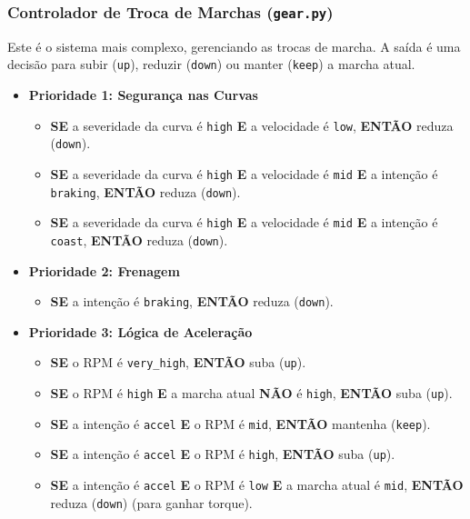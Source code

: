 \documentclass[12pt]{article}
\begin{document}
\subsubsection{Controlador de Troca de Marchas (\texttt{gear.py})}
Este é o sistema mais complexo, gerenciando as trocas de marcha. A saída é uma decisão para subir (\texttt{up}), reduzir (\texttt{down}) ou manter (\texttt{keep}) a marcha atual.
\begin{itemize}[label=\textbullet, leftmargin=*]
    \item \textbf{Prioridade 1: Segurança nas Curvas}
    \begin{itemize}
        \item \textbf{SE} a severidade da curva é \texttt{high} \textbf{E} a velocidade é \texttt{low}, \textbf{ENTÃO} reduza (\texttt{down}).
        \item \textbf{SE} a severidade da curva é \texttt{high} \textbf{E} a velocidade é \texttt{mid} \textbf{E} a intenção é \texttt{braking}, \textbf{ENTÃO} reduza (\texttt{down}).
        \item \textbf{SE} a severidade da curva é \texttt{high} \textbf{E} a velocidade é \texttt{mid} \textbf{E} a intenção é \texttt{coast}, \textbf{ENTÃO} reduza (\texttt{down}).
    \end{itemize}
    \item \textbf{Prioridade 2: Frenagem}
    \begin{itemize}
        \item \textbf{SE} a intenção é \texttt{braking}, \textbf{ENTÃO} reduza (\texttt{down}).
    \end{itemize}
    \item \textbf{Prioridade 3: Lógica de Aceleração}
    \begin{itemize}
        \item \textbf{SE} o RPM é \texttt{very\_high}, \textbf{ENTÃO} suba (\texttt{up}).
        \item \textbf{SE} o RPM é \texttt{high} \textbf{E} a marcha atual \textbf{NÃO} é \texttt{high}, \textbf{ENTÃO} suba (\texttt{up}).
        \item \textbf{SE} a intenção é \texttt{accel} \textbf{E} o RPM é \texttt{mid}, \textbf{ENTÃO} mantenha (\texttt{keep}).
        \item \textbf{SE} a intenção é \texttt{accel} \textbf{E} o RPM é \texttt{high}, \textbf{ENTÃO} suba (\texttt{up}).
        \item \textbf{SE} a intenção é \texttt{accel} \textbf{E} o RPM é \texttt{low} \textbf{E} a marcha atual é \texttt{mid}, \textbf{ENTÃO} reduza (\texttt{down}) (para ganhar torque).

\end{itemize}
\end{itemize}
\end{document}

